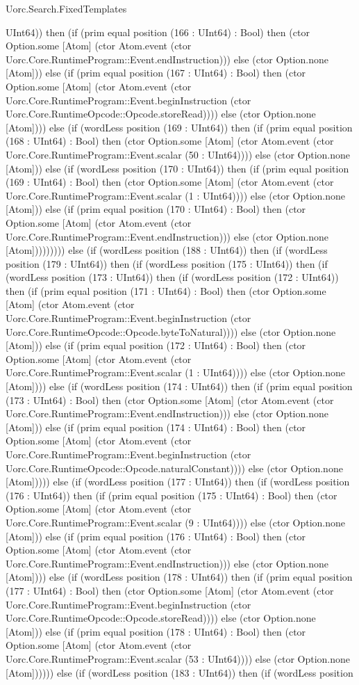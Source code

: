 \begin{lexlean}{Uorc.Search.FixedTemplates}
\begin{semanticmodule}
{UInt64)) then (if (prim equal position (166 : UInt64) : Bool) then (ctor Option.some [Atom] (ctor Atom.event (ctor Uorc.Core.RuntimeProgram::Event.endInstruction))) else (ctor Option.none [Atom])) else (if (prim equal position (167 : UInt64) : Bool) then (ctor Option.some [Atom] (ctor Atom.event (ctor Uorc.Core.RuntimeProgram::Event.beginInstruction (ctor Uorc.Core.RuntimeOpcode::Opcode.storeRead)))) else (ctor Option.none [Atom]))) else (if (wordLess position (169 : UInt64)) then (if (prim equal position (168 : UInt64) : Bool) then (ctor Option.some [Atom] (ctor Atom.event (ctor Uorc.Core.RuntimeProgram::Event.scalar (50 : UInt64)))) else (ctor Option.none [Atom])) else (if (wordLess position (170 : UInt64)) then (if (prim equal position (169 : UInt64) : Bool) then (ctor Option.some [Atom] (ctor Atom.event (ctor Uorc.Core.RuntimeProgram::Event.scalar (1 : UInt64)))) else (ctor Option.none [Atom])) else (if (prim equal position (170 : UInt64) : Bool) then (ctor Option.some [Atom] (ctor Atom.event (ctor Uorc.Core.RuntimeProgram::Event.endInstruction))) else (ctor Option.none [Atom])))))))) else (if (wordLess position (188 : UInt64)) then (if (wordLess position (179 : UInt64)) then (if (wordLess position (175 : UInt64)) then (if (wordLess position (173 : UInt64)) then (if (wordLess position (172 : UInt64)) then (if (prim equal position (171 : UInt64) : Bool) then (ctor Option.some [Atom] (ctor Atom.event (ctor Uorc.Core.RuntimeProgram::Event.beginInstruction (ctor Uorc.Core.RuntimeOpcode::Opcode.byteToNatural)))) else (ctor Option.none [Atom])) else (if (prim equal position (172 : UInt64) : Bool) then (ctor Option.some [Atom] (ctor Atom.event (ctor Uorc.Core.RuntimeProgram::Event.scalar (1 : UInt64)))) else (ctor Option.none [Atom]))) else (if (wordLess position (174 : UInt64)) then (if (prim equal position (173 : UInt64) : Bool) then (ctor Option.some [Atom] (ctor Atom.event (ctor Uorc.Core.RuntimeProgram::Event.endInstruction))) else (ctor Option.none [Atom])) else (if (prim equal position (174 : UInt64) : Bool) then (ctor Option.some [Atom] (ctor Atom.event (ctor Uorc.Core.RuntimeProgram::Event.beginInstruction (ctor Uorc.Core.RuntimeOpcode::Opcode.naturalConstant)))) else (ctor Option.none [Atom])))) else (if (wordLess position (177 : UInt64)) then (if (wordLess position (176 : UInt64)) then (if (prim equal position (175 : UInt64) : Bool) then (ctor Option.some [Atom] (ctor Atom.event (ctor Uorc.Core.RuntimeProgram::Event.scalar (9 : UInt64)))) else (ctor Option.none [Atom])) else (if (prim equal position (176 : UInt64) : Bool) then (ctor Option.some [Atom] (ctor Atom.event (ctor Uorc.Core.RuntimeProgram::Event.endInstruction))) else (ctor Option.none [Atom]))) else (if (wordLess position (178 : UInt64)) then (if (prim equal position (177 : UInt64) : Bool) then (ctor Option.some [Atom] (ctor Atom.event (ctor Uorc.Core.RuntimeProgram::Event.beginInstruction (ctor Uorc.Core.RuntimeOpcode::Opcode.storeRead)))) else (ctor Option.none [Atom])) else (if (prim equal position (178 : UInt64) : Bool) then (ctor Option.some [Atom] (ctor Atom.event (ctor Uorc.Core.RuntimeProgram::Event.scalar (53 : UInt64)))) else (ctor Option.none [Atom]))))) else (if (wordLess position (183 : UInt64)) then (if (wordLess position }
\end{semanticmodule}
\end{lexlean}
